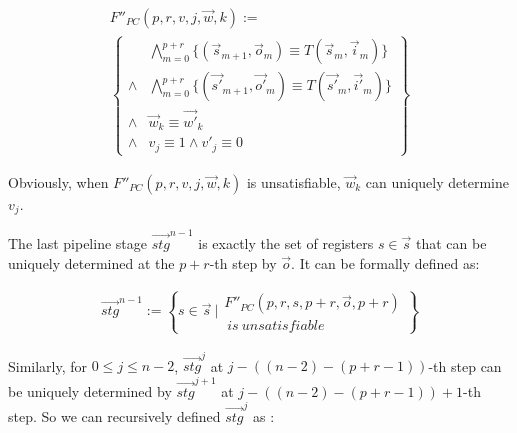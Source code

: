 \documentclass[twocolumn]{article}
\begin{document}
\begin{multline}\label{uniqt2}
F''_{PC}(p,r,v,j,\vec{w},k):=\\
\left\{
\begin{array}{cc}
&\bigwedge_{m=0}^{p+r}
\{
(\vec{s}_{m+1},\vec{o}_m)\equiv T(\vec{s}_m,\vec{i}_m)
\}
\\
\wedge&\bigwedge_{m=0}^{p+r}
\{
(\vec{s'}_{m+1},\vec{o'}_m)\equiv T(\vec{s'}_m,\vec{i'}_m)
\}
\\
\wedge&\vec{w}_{k}\equiv \vec{w'}_{k} \\
\wedge& v_{j}\equiv 1 \wedge  v'_{j}\equiv 0 
\end{array}
\right\}
\end{multline}

Obviously,
when $F''_{PC}(p,r,v,j,\vec{w},k)$ is unsatisfiable,
$\vec{w}_k$ can uniquely determine $v_j$.

The last pipeline stage $\vec{stg}^{n-1}$ is 
exactly the set of registers $s\in \vec{s}$ 
that can be uniquely determined at the $p+r$-th step by $\vec{o}$.
It can be formally defined as:

\begin{multline}\label{stgn_1}
 \vec{stg}^{n-1} := 
\left\{
 s\in \vec{s} ~| 
\begin{array}{cc}
 F''_{PC}(p,r,
 s,p+r,
 \vec{o},p+r)\\
 ~is~unsatisfiable
\end{array}
\right\}
\end{multline}

% 

Similarly,
for $0\le j\le n-2$,
$\vec{stg}^j$ at $j-((n-2)-(p+r-1))$-th step
can be uniquely determined by $\vec{stg}^{j+1}$ at $j-((n-2)-(p+r-1))+1$-th step.
So we can recursively defined $\vec{stg}^j$ as :
\end{document}
